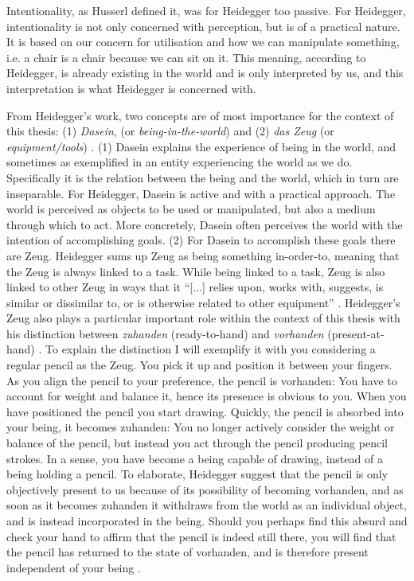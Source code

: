 Intentionality, as Husserl defined it, was for Heidegger too passive. For Heidegger, intentionality is not only concerned with perception, but is of a practical nature. It is based on our concern for utilisation and how we can manipulate something, i.e. a chair is a chair because we can sit on it. This meaning, according to Heidegger, is already existing in the world and is only interpreted by us, and this interpretation is what Heidegger is concerned with.

From Heidegger's work, two concepts are of most importance for the context of this thesis: (1) \textit{Dasein}, (or \textit{being-in-the-world}) and (2) \textit{das Zeug} (or \textit{equipment/tools}) \cite{heidegger}.
(1) Dasein explains the experience of being in the world, and sometimes as exemplified in an entity experiencing the world as we do. Specifically it is the relation between the being and the world, which in turn are inseparable. For Heidegger, Dasein is active and with a practical approach. The world is perceived as objects to be used or manipulated, but also a medium through which to act. More concretely, Dasein often perceives the world with the intention of accomplishing goals.
(2) For Dasein to accomplish these goals there are Zeug. Heidegger sums up Zeug as being something in-order-to, meaning that the Zeug is always linked to a task. While being linked to a task, Zeug is also linked to other Zeug in ways that it ``[...] relies upon, works with, suggests, is similar or dissimilar to, or is otherwise related to other equipment'' \cite[p. 109]{dourish}. Heidegger's Zeug also plays a particular important role within the context of this thesis with his distinction between \textit{zuhanden} (ready-to-hand) and \textit{vorhanden} (present-at-hand) \cite{heidegger}. To explain the distinction I will exemplify it with you considering a regular pencil as the Zeug. You pick it up and position it between your fingers. As you align the pencil to your preference, the pencil is vorhanden: You have to account for weight and balance it, hence its presence is obvious to you. When you have positioned the pencil you start drawing. Quickly, the pencil is absorbed into your being, it becomes zuhanden: You no longer actively consider the weight or balance of the pencil, but instead you act through the pencil producing pencil strokes. In a sense, you have become a being capable of drawing, instead of a being holding a pencil. To elaborate, Heidegger suggest that the pencil is only objectively present to us because of its possibility of becoming vorhanden, and as soon as it becomes zuhanden it withdraws from the world as an individual object, and is instead incorporated in the being. Should you perhaps find this absurd and check your hand to affirm that the pencil is indeed still there, you will find that the pencil has returned to the state of vorhanden, and is therefore present independent of your being \cite{dourish}.

